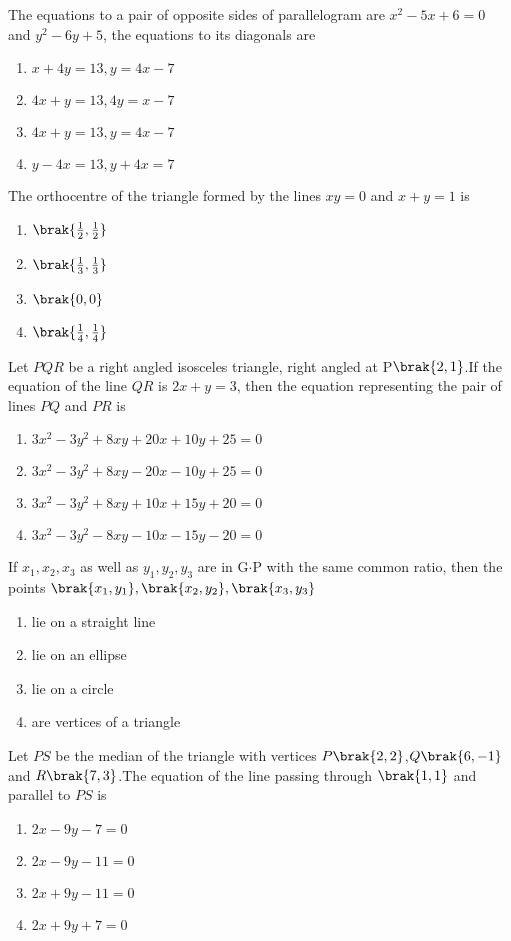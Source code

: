 \item{ The equations to a pair of opposite sides of parallelogram are $x^{2}-5x+6=0$ and $y^{2}-6y+5$, the equations to its diagonals are \hfill{}
\begin{enumerate}[label=(\alph*)]
    \item $x+4y=13,y=4x-7$
    \item $4x+y=13,4y=x-7$
    \item $4x+y=13,y=4x-7$
    \item $y-4x=13,y+4x=7$
\end{enumerate}}
\item{ The orthocentre of the triangle formed by the lines $xy=0$ and $x+y=1$ is \hfill{}
\begin{enumerate}[label=(\alph*)]
    \item $\brak{\frac{1}{2},\frac{1}{2}}$
    \item $\brak{\frac{1}{3},\frac{1}{3}}$
    \item $\brak{0,0}$
    \item $\brak{\frac{1}{4},\frac{1}{4}}$
\end{enumerate}}
\item{ Let $PQR$ be a right angled isosceles triangle, right angled at P$\brak{2,1}$.If the equation of the line $QR$ is $2x+y=3$, then the equation representing the pair of lines $PQ$ and $PR$ is \hfill{}
\begin{enumerate}[label=(\alph*)]
    \item $3x^{2}-3y^{2}+8xy+20x+10y+25=0$
    \item $3x^{2}-3y^{2}+8xy-20x-10y+25=0$
    \item $3x^{2}-3y^{2}+8xy+10x+15y+20=0$
    \item $3x^{2}-3y^{2}-8xy-10x-15y-20=0$
\end{enumerate}}
\item{If $x_1,x_2,x_3$ as well as $y_1,y_2,y_3$ are in G$\cdot$P with the same common ratio, then the points $\brak{x_1,y_1},\brak{x_2,y_2},\brak{x_3,y_3}$\hfill{}
\begin{enumerate}[label=(\alph*)]
    \item lie on a straight line
    \item lie on an ellipse
    \item lie on a circle 
    \item are vertices of a triangle
\end{enumerate}}
\item{ Let $PS$ be the median of the triangle with vertices $P\brak{2,2}$,$Q\brak{6,-1}$ and $R\brak{7,3}$.The equation of the line passing through $\brak{1,1}$ and parallel to $PS$ is \hfill{}
\begin{enumerate}[label=(\alph*)]
    \item $2x-9y-7=0$
    \item $2x-9y-11=0$
    \item $2x+9y-11=0$
    \item $2x+9y+7=0$

\end{enumerate}}
